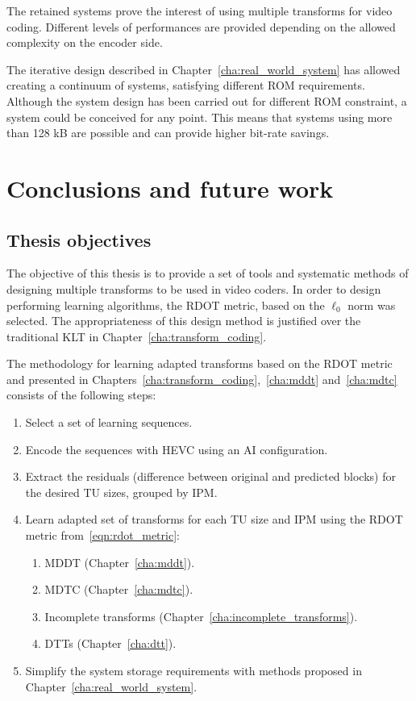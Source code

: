 \documentclass[11pt,a4paper,openright,twoside]{book}
\numberwithin{equation}{section} %
\numberwithin{figure}{section} %
\numberwithin{table}{section} %
\begin{document}
The retained systems prove the interest of using multiple transforms for video
coding.
Different levels of performances are provided depending on the allowed
complexity on the encoder side.

The iterative design described in Chapter~\ref{cha:real_world_system} has
allowed creating a continuum of systems, satisfying different \acs{ROM}
requirements.
Although the system design has been carried out for different \acs{ROM}
constraint, a system could be conceived for any point.
This means that systems using more than 128 kB are possible and can provide
higher bit-rate savings.

\chapter{Conclusions and future work}
\label{cha:conclusions_and_future_work}

\pagestyle{empty}

\section*{Thesis objectives}
\label{sec:thesis_objectives}

The objective of this thesis is to provide a set of tools and systematic
methods of designing multiple transforms to be used in video coders.
In order to design performing learning algorithms, the \ac{RDOT} metric, based
on the $\ell_0$ norm was selected.
The appropriateness of this design method is justified over the traditional
\ac{KLT} in Chapter~\ref{cha:transform_coding}.

The methodology for learning adapted transforms based on the \ac{RDOT} metric
and presented in Chapters~\ref{cha:transform_coding},~\ref{cha:mddt}
and~\ref{cha:mdtc} consists of the following steps:
\begin{enumerate}
	\item Select a set of learning sequences.
	\item Encode the sequences with \ac{HEVC} using an \ac{AI} configuration.
	\item Extract the residuals (difference between original and predicted
		blocks) for the desired \ac{TU} sizes, grouped by \ac{IPM}.
	\item Learn adapted set of transforms for each \ac{TU} size and \ac{IPM}
		using the \acs{RDOT} metric from~\eqref{eqn:rdot_metric}:
		\begin{enumerate}
			\item \acs{MDDT} (Chapter~\ref{cha:mddt}).
			\item \acs{MDTC} (Chapter~\ref{cha:mdtc}).
			\item Incomplete transforms
				(Chapter~\ref{cha:incomplete_transforms}).
			\item \acp{DTT} (Chapter~\ref{cha:dtt}).
		\end{enumerate}
	\item Simplify the system storage requirements with methods proposed in
		Chapter~\ref{cha:real_world_system}.
\end{enumerate}
\end{document}
